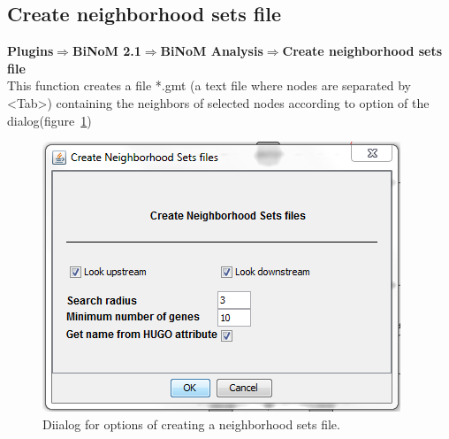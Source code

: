 
\subsection{Create neighborhood sets file}
\textbf{Plugins$\Rightarrow$BiNoM 2.1$\Rightarrow$BiNoM Analysis$\Rightarrow$Create neighborhood sets file}\\
This function creates a file *.gmt (a text file where nodes are separated by \textless Tab\textgreater) containing the neighbors of selected nodes according to option of the dialog(figure~\ref{Create_Neigborhood_File_Dialog})
\begin{figure}
\centering
\includegraphics[width=7 cm]{graphics/Create_Neigborhood_File_Dialog}
\caption{Diialog for options of creating a neighborhood sets file.}
\label{Create_Neigborhood_File_Dialog}
\end{figure}  
